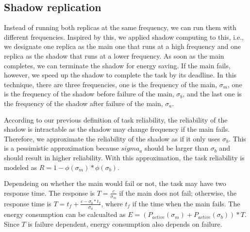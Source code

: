 \subsection{Shadow replication}
Instead of running both replicas at the same frequency, we can run them with different frequencies. Inspired by this, we applied shadow computing to this, i.e., we designate one replica as the main one that runs at a high frequency and one replica as the shadow that runs at a lower frequency. As soon as the main completes, we can terminate the shadow for energy saving. If the main fails, however, we speed up the shadow to complete the task by its deadline. In this technique, there are three frequencies, one is the frequency of the main, $\sigma_m$, one is the frequency of the shadow before failure of the main, $\sigma_b$, and the last one is the frequency of the shadow after failure of the main, $\sigma_a$. 

According to our previous definition of task reliability, the reliability of the shadow is intractable as the shadow may change frequency if the main fails. Therefore, we approximate the reliability of the shadow as if it only uses $\sigma_b$. This is a pessimistic approximation because $sigma_a$ should be larger than $\sigma_b$ and should result in higher reliability. With this approximation, the task reliability is modeled as $R = 1 - \phi(\sigma_m)*\phi(\sigma_b)$.

Dependeing on whether the main would fail or not, the task may have two response time. The response is $T=\frac{c}{\sigma_m}$ if the main does not fail; otherwise, the response time is $T=t_f + \frac{c - \sigma_b*t_f}{\sigma_a}$, where $t_f$ if the time when the main fails. The energy consumption can be calcualted as $E = (P_{active}(\sigma_m) +P_{active}(\sigma_b))*T$. Since $T$ is failure dependent, energy consumption
also depends on failure.  

